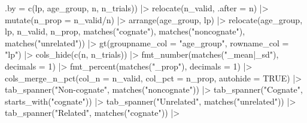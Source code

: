 \documentclass[
  letterpaper,
  DIV=11,
  numbers=noendperiod]{scrartcl}
\newenvironment{Shaded}{\begin{snugshade}}{\end{snugshade}}
\newcommand{\AttributeTok}[1]{\textcolor[rgb]{0.40,0.45,0.13}{#1}}
\newcommand{\ConstantTok}[1]{\textcolor[rgb]{0.56,0.35,0.01}{#1}}
\newcommand{\DecValTok}[1]{\textcolor[rgb]{0.68,0.00,0.00}{#1}}
\newcommand{\FunctionTok}[1]{\textcolor[rgb]{0.28,0.35,0.67}{#1}}
\newcommand{\NormalTok}[1]{\textcolor[rgb]{0.00,0.23,0.31}{#1}}
\newcommand{\SpecialCharTok}[1]{\textcolor[rgb]{0.37,0.37,0.37}{#1}}
\newcommand{\StringTok}[1]{\textcolor[rgb]{0.13,0.47,0.30}{#1}}
\begin{document}
\begin{Shaded}
\begin{Highlighting}[]
              \AttributeTok{.by =} \FunctionTok{c}\NormalTok{(lp, age\_group, n, n\_trials)) }\SpecialCharTok{|\textgreater{}}
    \FunctionTok{relocate}\NormalTok{(n\_valid, }\AttributeTok{.after =}\NormalTok{ n) }\SpecialCharTok{|\textgreater{}} 
    \FunctionTok{mutate}\NormalTok{(}\AttributeTok{n\_prop =}\NormalTok{ n\_valid}\SpecialCharTok{/}\NormalTok{n) }\SpecialCharTok{|\textgreater{}} 
    \FunctionTok{arrange}\NormalTok{(age\_group, lp) }\SpecialCharTok{|\textgreater{}} 
    \FunctionTok{relocate}\NormalTok{(age\_group, lp, n\_valid, n\_prop, }
             \FunctionTok{matches}\NormalTok{(}\StringTok{"cognate"}\NormalTok{),}
             \FunctionTok{matches}\NormalTok{(}\StringTok{"noncognate"}\NormalTok{),}
             \FunctionTok{matches}\NormalTok{(}\StringTok{"unrelated"}\NormalTok{)) }\SpecialCharTok{|\textgreater{}} 
    \FunctionTok{gt}\NormalTok{(}\AttributeTok{groupname\_col =} \StringTok{"age\_group"}\NormalTok{,}
       \AttributeTok{rowname\_col =} \StringTok{"lp"}\NormalTok{)  }\SpecialCharTok{|\textgreater{}}
    \FunctionTok{cols\_hide}\NormalTok{(}\FunctionTok{c}\NormalTok{(n, n\_trials)) }\SpecialCharTok{|\textgreater{}} 
    \FunctionTok{fmt\_number}\NormalTok{(}\FunctionTok{matches}\NormalTok{(}\StringTok{"\_mean|\_sd"}\NormalTok{), }
               \AttributeTok{decimals =} \DecValTok{1}\NormalTok{) }\SpecialCharTok{|\textgreater{}}
    \FunctionTok{fmt\_percent}\NormalTok{(}\FunctionTok{matches}\NormalTok{(}\StringTok{"\_prop"}\NormalTok{),}
                \AttributeTok{decimals =} \DecValTok{1}\NormalTok{) }\SpecialCharTok{|\textgreater{}} 
    \FunctionTok{cols\_merge\_n\_pct}\NormalTok{(}\AttributeTok{col\_n =}\NormalTok{ n\_valid, }
                     \AttributeTok{col\_pct =}\NormalTok{ n\_prop,}
                     \AttributeTok{autohide =} \ConstantTok{TRUE}\NormalTok{)  }\SpecialCharTok{|\textgreater{}} 
    \FunctionTok{tab\_spanner}\NormalTok{(}\StringTok{"Non{-}cognate"}\NormalTok{, }\FunctionTok{matches}\NormalTok{(}\StringTok{"noncognate"}\NormalTok{)) }\SpecialCharTok{|\textgreater{}}
    \FunctionTok{tab\_spanner}\NormalTok{(}\StringTok{"Cognate"}\NormalTok{, }\FunctionTok{starts\_with}\NormalTok{(}\StringTok{"cognate"}\NormalTok{)) }\SpecialCharTok{|\textgreater{}}
    \FunctionTok{tab\_spanner}\NormalTok{(}\StringTok{"Unrelated"}\NormalTok{, }\FunctionTok{matches}\NormalTok{(}\StringTok{"unrelated"}\NormalTok{)) }\SpecialCharTok{|\textgreater{}}
    \FunctionTok{tab\_spanner}\NormalTok{(}\StringTok{"Related"}\NormalTok{, }\FunctionTok{matches}\NormalTok{(}\StringTok{"cognate"}\NormalTok{)) }\SpecialCharTok{|\textgreater{}} 

\end{Highlighting}
\end{Shaded}
\end{document}
